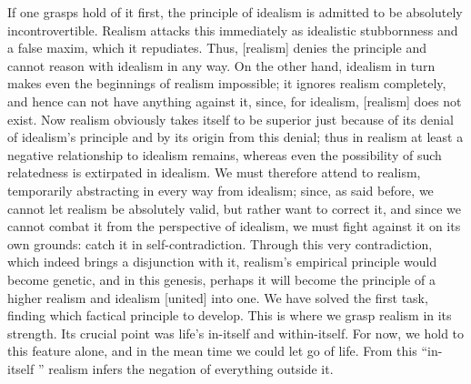 If one grasps hold of it first,
the principle of idealism is
admitted to be absolutely incontrovertible.
Realism attacks this immediately
as idealistic stubbornness and a false maxim,
which it repudiates.
Thus, [realism] denies the principle
and cannot reason with idealism in any way.
On the other hand, idealism in turn makes
even the beginnings of realism impossible;
it ignores realism completely,
and hence can not have anything against it,
since, for idealism, [realism] does not exist.
Now realism obviously takes itself to be superior
just because of its denial of idealism's principle
and by its origin from this denial;
thus in realism at least
a negative relationship to idealism remains,
whereas even the possibility of such relatedness
is extirpated in idealism.
We must therefore attend to realism,
temporarily abstracting in every way from idealism;
since, as said before, we cannot let
realism be absolutely valid,
but rather want to correct it,
and since we cannot combat it
from the perspective of idealism,
we must fight against it on its own grounds:
catch it in self-contradiction.
Through this very contradiction,
which indeed brings a disjunction with it,
realism's empirical principle would become genetic,
and in this genesis, perhaps it will become
the principle of a higher realism and idealism [united] into one.
We have solved the first task,
finding which factical principle to develop.
This is where we grasp realism in its strength.
Its crucial point was life's in-itself and within-itself.
For now, we hold to this feature alone,
and in the mean time we could let go of life.
From this “in-itself ” realism infers
the negation of everything outside it.

